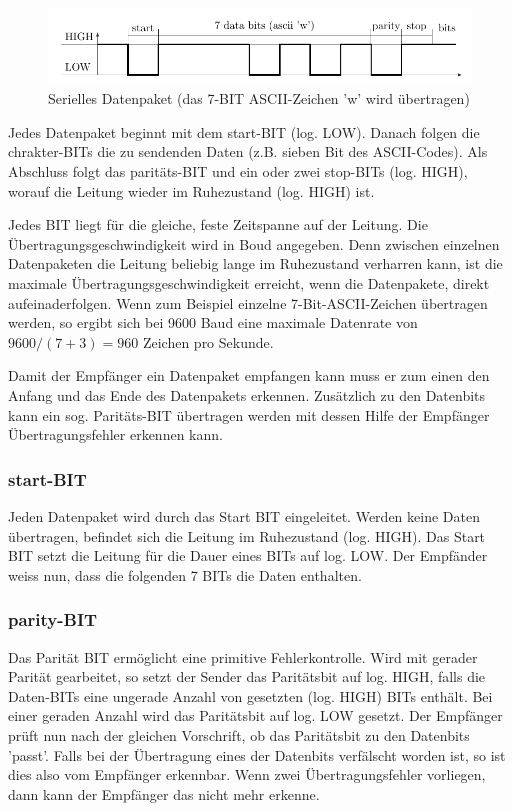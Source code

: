 \begin{figure}[htbp]
  \begin{center}
      \includegraphics{Anhang/Tikz/serialDaten.pdf}
  \end{center}
  \label{fig:serialDaten}
  \caption{Serielles Datenpaket (das 7-BIT ASCII-Zeichen 'w' wird übertragen)}
\end{figure}

Jedes Datenpaket beginnt mit dem start-BIT (log. LOW). Danach folgen die chrakter-BITs die zu sendenden Daten (z.B. sieben Bit des ASCII-Codes). Als Abschluss folgt das paritäts-BIT und ein oder zwei stop-BITs (log. HIGH), worauf die Leitung wieder im Ruhezustand (log. HIGH) ist. 

Jedes BIT liegt für die gleiche, feste Zeitspanne auf der Leitung. Die Übertragungsgeschwindigkeit wird in Boud angegeben.  
Denn zwischen einzelnen Datenpaketen die Leitung beliebig lange im Ruhezustand verharren kann, ist die maximale Übertragungsgeschwindigkeit erreicht, wenn die Datenpakete, direkt aufeinaderfolgen. Wenn zum Beispiel einzelne 7-Bit-ASCII-Zeichen übertragen werden, so ergibt sich bei 9600 Baud eine maximale Datenrate von $ 9600/(7+3) = 960 $ Zeichen pro Sekunde. 

Damit der Empfänger ein Datenpaket empfangen kann muss er zum einen den Anfang und das Ende des Datenpakets erkennen. Zusätzlich zu den Datenbits kann ein sog. Paritäts-BIT übertragen werden mit dessen Hilfe der  Empfänger Übertragungsfehler erkennen kann.  

\subsubsection{start-BIT}
Jeden Datenpaket wird durch das Start BIT eingeleitet. Werden keine Daten übertragen, befindet sich die Leitung im Ruhezustand (log. HIGH). Das Start BIT setzt die Leitung für die Dauer eines BITs auf log. LOW. Der Empfänder weiss nun, dass die folgenden 7 BITs die Daten enthalten.


\subsubsection{parity-BIT}
Das Parität BIT ermöglicht eine primitive Fehlerkontrolle. Wird mit gerader Parität gearbeitet, so setzt der Sender das Paritätsbit auf log. HIGH, falls die Daten-BITs eine ungerade Anzahl von gesetzten (log. HIGH) BITs enthält. Bei einer geraden Anzahl wird das Paritätsbit auf log. LOW gesetzt. Der Empfänger prüft nun nach der gleichen Vorschrift, ob das Paritätsbit zu den Datenbits 'passt'. Falls bei der Übertragung eines der Datenbits verfälscht worden ist, so ist dies also vom Empfänger erkennbar. Wenn zwei Übertragungsfehler vorliegen, dann kann der Empfänger das nicht mehr erkenne.


